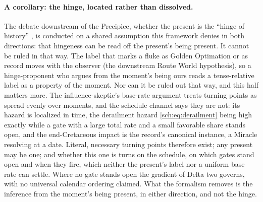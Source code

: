 \paragraph{A corollary: the hinge, located rather than dissolved.}
The debate downstream of the Precipice, whether the present is the
``hinge of history'' \cite{MacAskill22,GM21}, is conducted on a
shared assumption this framework denies in both directions: that
hingeness can be read off the present's being present. It cannot be
ruled in that way. The label that marks a fluke as Golden Optimation or
as record moves with the observer (the downstream Route World hypothesis), so a
hinge-proponent who argues from the moment's being ours reads a
tense-relative label as a property of the moment. Nor can it be ruled
out that way, and this half matters more. The influence-skeptic's
base-rate argument treats turning points as spread evenly over moments,
and the schedule channel says they are not: its hazard is localized in
time, the derailment hazard \eqref{sch:eq:derailment} being high exactly
while a gate with a large total rate and a small favorable share stands
open, and the end-Cretaceous impact is the record's canonical instance,
a Miracle resolving at a date. Literal, necessary turning points
therefore exist; any present may be one; and whether this one is turns
on the schedule, on which gates stand open and when they fire, which
neither the present's label nor a uniform base rate can settle. Where no
gate stands open the gradient of Delta two governs, with
no universal calendar ordering claimed. What the formalism removes is
the inference from the moment's being present, in either direction, and
not the hinge.

